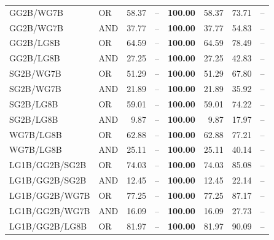 \documentclass{article}
\begin{document}
{\begin{longtable}{llrrrrrr}
 GG2B/WG7B                & OR      & 58.37            & --            & \textbf{100.00} & 58.37            & 73.71            & --    \\
 GG2B/WG7B                & AND     & 37.77            & --            & \textbf{100.00} & 37.77            & 54.83            & --    \\
 GG2B/LG8B                & OR      & 64.59            & --            & \textbf{100.00} & 64.59            & 78.49            & --    \\
 GG2B/LG8B                & AND     & 27.25            & --            & \textbf{100.00} & 27.25            & 42.83            & --    \\
 SG2B/WG7B                & OR      & 51.29            & --            & \textbf{100.00} & 51.29            & 67.80            & --    \\
 SG2B/WG7B                & AND     & 21.89            & --            & \textbf{100.00} & 21.89            & 35.92            & --    \\
 SG2B/LG8B                & OR      & 59.01            & --            & \textbf{100.00} & 59.01            & 74.22            & --    \\
 SG2B/LG8B                & AND     & 9.87             & --            & \textbf{100.00} & 9.87             & 17.97            & --    \\
 WG7B/LG8B                & OR      & 62.88            & --            & \textbf{100.00} & 62.88            & 77.21            & --    \\
 WG7B/LG8B                & AND     & 25.11            & --            & \textbf{100.00} & 25.11            & 40.14            & --    \\
 LG1B/GG2B/SG2B           & OR      & 74.03            & --            & \textbf{100.00} & 74.03            & 85.08            & --    \\
 LG1B/GG2B/SG2B           & AND     & 12.45            & --            & \textbf{100.00} & 12.45            & 22.14            & --    \\
 LG1B/GG2B/WG7B           & OR      & 77.25            & --            & \textbf{100.00} & 77.25            & 87.17            & --    \\
 LG1B/GG2B/WG7B           & AND     & 16.09            & --            & \textbf{100.00} & 16.09            & 27.73            & --    \\
 LG1B/GG2B/LG8B           & OR      & 81.97            & --            & \textbf{100.00} & 81.97            & 90.09            & --    \\

\end{longtable}}
\end{document}
